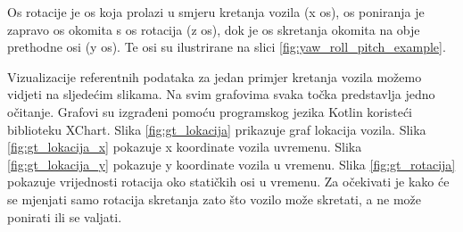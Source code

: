 Os rotacije je os koja prolazi u smjeru kretanja vozila (x os), os poniranja je zapravo os okomita s os rotacija (z os), dok je os skretanja okomita na obje prethodne osi (y os). Te osi su ilustrirane na slici \ref{fig:yaw_roll_pitch_example}.

Vizualizacije referentnih podataka za jedan primjer kretanja vozila možemo vidjeti na sljedećim slikama. Na svim grafovima svaka točka predstavlja jedno očitanje. Grafovi su izgrađeni pomoću programskog jezika Kotlin koristeći biblioteku XChart. Slika \ref{fig:gt_lokacija} prikazuje graf lokacija vozila. Slika \ref{fig:gt_lokacija_x} pokazuje x koordinate vozila  uvremenu. Slika \ref{fig:gt_lokacija_y} pokazuje y koordinate vozila u vremenu. Slika \ref{fig:gt_rotacija} pokazuje vrijednosti rotacija oko statičkih osi u vremenu. Za očekivati je kako će se mjenjati samo rotacija skretanja zato što vozilo može skretati, a ne može ponirati ili se valjati. 

